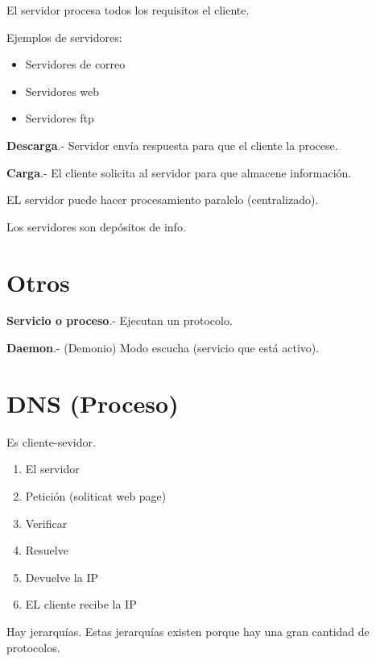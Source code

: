 \documentclass{article}
\begin{document}
El servidor procesa todos los requisitos el cliente.
\vspace{1em}

Ejemplos de servidores:

\begin{itemize}
	\item
	Servidores de correo
	\item
	Servidores web
	\item
	Servidores ftp
\end{itemize}
\vspace{1em}

\textbf{Descarga}.- Servidor envía respuesta para que el cliente la procese.
\vspace{1em}

\textbf{Carga}.- El cliente solicita al servidor para que almacene información.
\vspace{1em}

EL servidor puede hacer procesamiento paralelo (centralizado).
\vspace{1em}

Los servidores son depósitos de info.

\section{Otros}
\textbf{Servicio o proceso}.- Ejecutan un protocolo.
\vspace{1em}

\textbf{Daemon}.- (Demonio) Modo escucha (servicio que está activo).

\section{DNS (Proceso)}

Es cliente-sevidor.
\vspace{1em}

\begin{enumerate}
	\item
	El servidor
	\item
	Petición (soliticat web page)
	\item
	Verificar
	\item
	Resuelve
	\item
	Devuelve la IP
	\item
	EL cliente recibe la IP
\end{enumerate}
\vspace{1em}

Hay jerarquías. Estas jerarquías existen porque hay una gran cantidad de protocolos.
\end{document}

